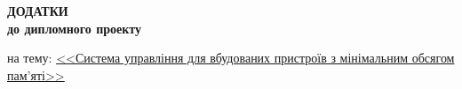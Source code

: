 \documentclass[oneside,14pt,a4paper,final]{myextreport}
\newenvironment{specialpage}{
  \clearpage
  \thispagestyle{empty}
  \enlargethispage{20mm}
  \singlespacing
  \begin{center}
}{
  \end{center}
  \clearpage
  \setcounter{page}{1}
  \thispagestyle{plain}
  \enlargethispage{-25mm}
}
\begin{document}
\enlargethispage{-25mm}







%



\begin{specialpage}
  \vspace*{\fill}

  \textbf{\large
  ДОДАТКИ\\
  до дипломного проекту
  }

  \vspace{10mm}
  на тему: \uline{<<Система управління для вбудованих пристроїв з мінімальним обсягом пам'яті>>}

  \vfill
\end{specialpage}


\end{document}
